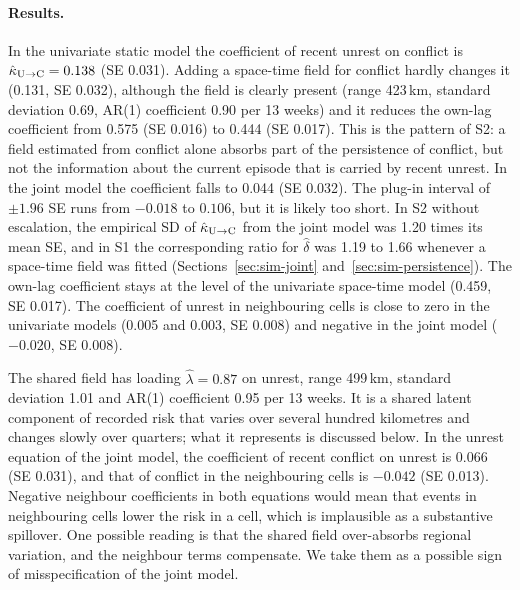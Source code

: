 \begin{table}
\caption{Conflict and unrest in West Africa and the Sahel: lag coefficients (standard
errors) of the conflict equation, hyperparameters of the space-time field, and test
scores for 2023--2024. Own: conflict in the previous four weeks; other: unrest in the
previous four weeks ($\kUC$); neighbour terms: the same histories averaged over the
rook neighbours of the cell. In the joint model the space-time field is shared by the
two outcomes and enters unrest with loading $\lambda$; its AR(1) coefficient is per
step of 13 weeks. Full results in Table~\ref{tab:app-joint-full} of the Supplementary
Material. Test scores here use the probit approximation to $E\{\operatorname{expit}(\eta)\}$; the model comparisons in the text use common Monte Carlo draws.}\label{tab:app-joint}
\centering\small
\resizebox{\textwidth}{!}{}
\end{table}

\paragraph{Results.} In the univariate static model the coefficient of recent unrest on
conflict is $\hat\kappa_{\mathrm{U}\to\mathrm{C}}  = 0.138$ (SE 0.031). Adding a space-time field for conflict
hardly changes it (0.131, SE 0.032), although the field is clearly present (range
423\,km, standard deviation 0.69, AR(1) coefficient 0.90 per 13 weeks) and it reduces
the own-lag coefficient from 0.575 (SE 0.016) to 0.444 (SE 0.017). This is the
pattern of S2: a field estimated from conflict alone absorbs part of the persistence
of conflict, but not the information about the current episode that is carried by
recent unrest. In the joint model the coefficient falls to 0.044 (SE 0.032). The
plug-in interval of $\pm 1.96$ SE runs from $-0.018$ to $0.106$, but it is likely too
short. In S2 without escalation, the empirical SD of $\hat\kappa_{\mathrm{U}\to\mathrm{C}}$ from the joint model
was 1.20 times its mean SE, and in S1 the corresponding ratio for $\hat\delta$ was
1.19 to 1.66 whenever a space-time field was fitted
(Sections~\ref{sec:sim-joint} and~\ref{sec:sim-persistence}).
The own-lag coefficient stays at the level of the univariate space-time model (0.459,
SE 0.017). The coefficient of unrest in neighbouring cells is close to zero in the
univariate models (0.005 and 0.003, SE 0.008) and negative in the joint model
($-0.020$, SE 0.008).

The shared field has loading $\hat\lambda = 0.87$ on unrest, range 499\,km, standard
deviation 1.01 and AR(1) coefficient 0.95 per 13 weeks. It is a shared latent
component of recorded risk that varies over several hundred kilometres and changes
slowly over quarters; what it represents is discussed below. In the unrest equation of
the joint model, the coefficient of recent conflict on unrest is 0.066 (SE 0.031), and
that of conflict in the neighbouring cells is $-0.042$ (SE 0.013). Negative
neighbour coefficients in both equations would mean that events in neighbouring cells
lower the risk in a cell, which is implausible as a substantive spillover. One
possible reading is that the shared field over-absorbs regional variation, and the
neighbour terms compensate. We take them as a possible sign of misspecification of
the joint model.


